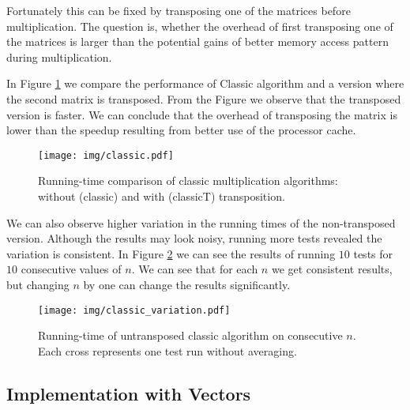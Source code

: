 \documentclass[a4paper,11pt]{article}
\begin{document}
Fortunately this can be fixed by transposing one of the matrices before multiplication. The question is, whether the overhead of first transposing one of the matrices is larger than the potential gains of better memory access pattern during multiplication.

In Figure \ref{fig:classic} we compare the performance of Classic algorithm and a version where the second matrix is transposed.
From the Figure we observe that the transposed version is faster. We can conclude that the overhead of transposing the matrix is lower than the speedup resulting from better use of the processor cache.

\begin{figure}[h]
\centering
\texttt{[image: img/classic.pdf]}
\caption{Running-time comparison of classic multiplication algorithms: without (\textsf{classic}) and with (\textsf{classicT}) transposition.}
\label{fig:classic}
\end{figure}

We can also observe higher variation in the running times of the non-transposed version. Although the results may look noisy, running more tests revealed the variation is consistent. In Figure \ref{fig:classic_var} we can see the results of running $10$ tests for $10$ consecutive values of $n$. We can see that for each $n$ we get consistent results, but changing $n$ by one can change the results significantly.  

\begin{figure}[h]
\centering
\texttt{[image: img/classic\_variation.pdf]}

\caption{Running-time of untransposed classic algorithm on consecutive $n$. Each cross represents one test run without averaging.}
\label{fig:classic_var}
\end{figure}

\subsection{Implementation with Vectors}
\end{document}
